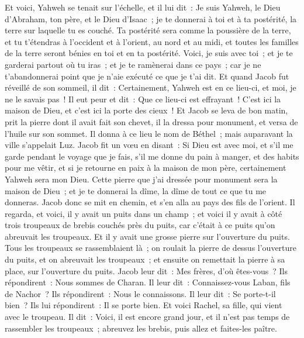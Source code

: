 \begin{multicols}{2}
Et voici, Yahweh se tenait sur l'échelle, et il lui dit~: Je suis Yahweh, le Dieu d'Abraham, ton père, et le Dieu d'Isaac~; je te donnerai à toi et à ta postérité, la terre sur laquelle tu es couché.
Ta postérité sera comme la poussière de la terre, et tu t'étendras à l'occident et à l'orient, au nord et au midi, et toutes les familles de la terre seront bénies en toi et en ta postérité.
Voici, je suis avec toi~; et je te garderai partout où tu iras~; et je te ramènerai dans ce pays~; car je ne t'abandonnerai point que je n'aie exécuté ce que je t'ai dit.
Et quand Jacob fut réveillé de son sommeil, il dit~: Certainement, Yahweh est en ce lieu-ci, et moi, je ne le savais pas~!
Il eut peur et dit~: Que ce lieu-ci est effrayant~! C'est ici la maison de Dieu, et c'est ici la porte des cieux~!
Et Jacob se leva de bon matin, prit la pierre dont il avait fait son chevet, il la dressa pour monument, et versa de l'huile sur son sommet.
Il donna à ce lieu le nom de Béthel~; mais auparavant la ville s'appelait Luz.
Jacob fit un vœu en disant~: Si Dieu est avec moi, et s'il me garde pendant le voyage que je fais, s'il me donne du pain à manger, et des habits pour me vêtir,
et si je retourne en paix à la maison de mon père, certainement Yahweh sera mon Dieu.
Cette pierre que j'ai dressée pour monument sera la maison de Dieu~; et je te donnerai la dîme, la dîme de tout ce que tu me donneras.
\VerseOne{}Jacob donc se mit en chemin, et s'en alla au pays des fils de l'orient.
Il regarda, et voici, il y avait un puits dans un champ~; et voici il y avait à côté trois troupeaux de brebis couchés près du puits, car c'était à ce puits qu'on abreuvait les troupeaux. Et il y avait une grosse pierre sur l'ouverture du puits.
Tous les troupeaux se rassemblaient là~; on roulait la pierre de dessus l'ouverture du puits, et on abreuvait les troupeaux~; et ensuite on remettait la pierre à sa place, sur l'ouverture du puits.
Jacob leur dit~: Mes frères, d'où êtes-vous~? Ils répondirent~: Nous sommes de Charan.
Il leur dit~: Connaissez-vous Laban, fils de Nachor~? Ils répondirent~: Nous le connaissons.
Il leur dit~: Se porte-t-il bien~? Ils lui répondirent~: Il se porte bien. Et voici Rachel, sa fille, qui vient avec le troupeau.
Il dit~: Voici, il est encore grand jour, et il n'est pas temps de rassembler les troupeaux~; abreuvez les brebis, puis allez et faites-les paître.

\end{multicols}
